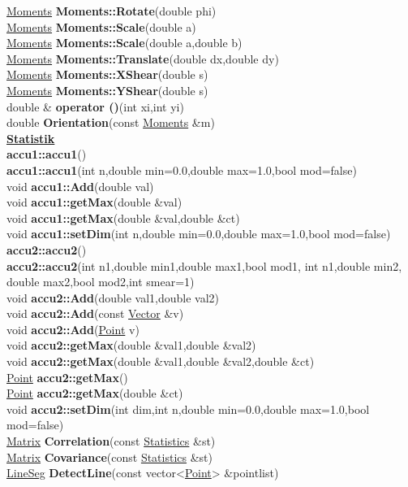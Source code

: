 \documentclass[10pt,titlepage]{article}
\newcommand{\subtitle}[1]{{\noindent\bf#1}}
\def\functionlistentry#1#2#3#4#5#6{\noindent #1 {\bf #2}(#3) \dotfill #6\\}
\begin{document}
{{\functionlistentry{\hyperlink{Moments}{Moments}}{Moments::Rotate}{double phi}{815}{moments}{}
\functionlistentry{\hyperlink{Moments}{Moments}}{Moments::Scale}{double a}{818}{moments}{}
\functionlistentry{\hyperlink{Moments}{Moments}}{Moments::Scale}{double a,double b}{819}{moments}{}
\functionlistentry{\hyperlink{Moments}{Moments}}{Moments::Translate}{double dx,double dy}{814}{moments}{}
\functionlistentry{\hyperlink{Moments}{Moments}}{Moments::XShear}{double s}{816}{moments}{}
\functionlistentry{\hyperlink{Moments}{Moments}}{Moments::YShear}{double s}{817}{moments}{}
\functionlistentry{double \&}{operator ()}{int xi,int yi}{811}{moments}{}
\functionlistentry{double}{Orientation}{const \hyperlink{Moments}{Moments} \&m}{857}{moments}{}

\subtitle{\hyperlink{SECTION:statistics}{Statistik}}\\
\functionlistentry{}{accu1::accu1}{}{917}{statistics}{}
\functionlistentry{}{accu1::accu1}{int n,double min=0.0,double max=1.0,bool mod=false}{919}{statistics}{}
\functionlistentry{void}{accu1::Add}{double val}{923}{statistics}{}
\functionlistentry{void}{accu1::getMax}{double \&val}{927}{statistics}{}
\functionlistentry{void}{accu1::getMax}{double \&val,double \&ct}{928}{statistics}{}
\functionlistentry{void}{accu1::setDim}{int n,double min=0.0,double max=1.0,bool mod=false}{921}{statistics}{}
\functionlistentry{}{accu2::accu2}{}{918}{statistics}{}
\functionlistentry{}{accu2::accu2}{int n1,double min1,double max1,bool mod1, int n1,double min2, double max2,bool mod2,int smear=1}{920}{statistics}{}
\functionlistentry{void}{accu2::Add}{double val1,double val2}{924}{statistics}{}
\functionlistentry{void}{accu2::Add}{const \hyperlink{Vector}{Vector} \&v}{925}{statistics}{}
\functionlistentry{void}{accu2::Add}{\hyperlink{Point}{Point} v}{926}{statistics}{}
\functionlistentry{void}{accu2::getMax}{double \&val1,double \&val2}{929}{statistics}{}
\functionlistentry{void}{accu2::getMax}{double \&val1,double \&val2,double \&ct}{930}{statistics}{}
\functionlistentry{\hyperlink{Point}{Point}}{accu2::getMax}{}{931}{statistics}{}
\functionlistentry{\hyperlink{Point}{Point}}{accu2::getMax}{double \&ct}{932}{statistics}{}
\functionlistentry{void}{accu2::setDim}{int dim,int n,double min=0.0,double max=1.0,bool mod=false}{922}{statistics}{}
\functionlistentry{\hyperlink{Matrix}{Matrix}}{Correlation}{const \hyperlink{Statistics}{Statistics} \&st}{871}{statistics}{}
\functionlistentry{\hyperlink{Matrix}{Matrix}}{Covariance}{const \hyperlink{Statistics}{Statistics} \&st}{870}{statistics}{}
\functionlistentry{\hyperlink{LineSeg}{LineSeg}}{DetectLine}{const vector<\hyperlink{Point}{Point}> \&pointlist}{933}{statistics}{}
}}
\end{document}
